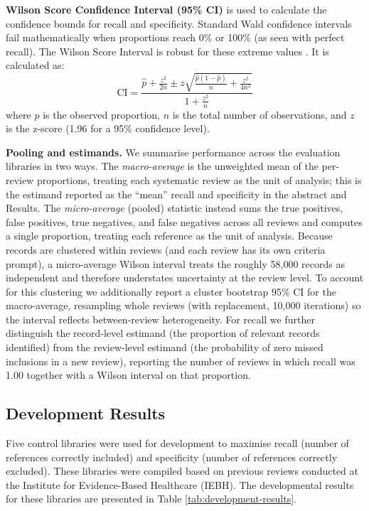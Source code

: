 \documentclass[11pt,a4paper]{article}
\begin{document}
\textbf{Wilson Score Confidence Interval (95\% CI)} is used to calculate the confidence bounds for recall and specificity. Standard Wald confidence intervals fail mathematically when proportions reach 0\% or 100\% (as seen with perfect recall). The Wilson Score Interval is robust for these extreme values \cite{wilson_probable_1927}. It is calculated as:
\begin{equation}
    \text{CI} = \frac{\hat{p} + \frac{z^2}{2n} \pm z \sqrt{\frac{\hat{p}(1-\hat{p})}{n} + \frac{z^2}{4n^2}}}{1 + \frac{z^2}{n}}
\end{equation}
where $\hat{p}$ is the observed proportion, $n$ is the total number of observations, and $z$ is the z-score (1.96 for a 95\% confidence level). \bigbreak

\textbf{Pooling and estimands.} We summarise performance across the evaluation libraries in two ways. The \textit{macro-average} is the unweighted mean of the per-review proportions, treating each systematic review as the unit of analysis; this is the estimand reported as the ``mean'' recall and specificity in the abstract and Results. The \textit{micro-average} (pooled) statistic instead sums the true positives, false positives, true negatives, and false negatives across all reviews and computes a single proportion, treating each reference as the unit of analysis. Because records are clustered within reviews (and each review has its own criteria prompt), a micro-average Wilson interval treats the roughly 58,000 records as independent and therefore understates uncertainty at the review level. To account for this clustering we additionally report a cluster bootstrap 95\% CI for the macro-average, resampling whole reviews (with replacement, 10,000 iterations) so the interval reflects between-review heterogeneity. For recall we further distinguish the record-level estimand (the proportion of relevant records identified) from the review-level estimand (the probability of zero missed inclusions in a new review), reporting the number of reviews in which recall was 1.00 together with a Wilson interval on that proportion. \bigbreak

\subsection{Development Results}
Five control libraries were used for development to maximise recall (number of references correctly included) and specificity (number of references correctly excluded). These libraries were compiled based on previous reviews conducted at the Institute for Evidence-Based Healthcare (IEBH). The developmental results for these libraries are presented in Table \ref{tab:development-results}.
\end{document}
